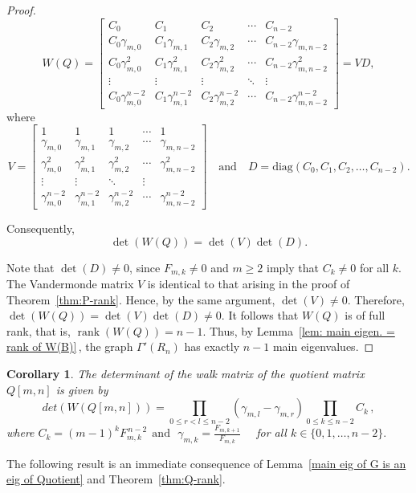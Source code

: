\documentclass[11pt,oneside]{article}
\theoremstyle{plain}
\theoremstyle{plain}
\newtheorem{corollary}[theorem]{Corollary}
\theoremstyle{definition}
\numberwithin{figure}{section}
\theoremstyle{remark}
\numberwithin{equation}{section}
\begin{document}
\begin{proof}
			\[\renewcommand{\arraystretch}{1.2}
			W(Q) =
			\begin{bmatrix}
				C_0 & C_1 & C_2 & \cdots & C_{n-2} \\
				C_0\gamma_{m,0} & C_1 \gamma_{m,1} & C_2 \gamma_{m,2} & \cdots & C_{n-2} \gamma_{m,n-2} \\
				C_0\gamma_{m,0}^2 & C_1 \gamma_{m,1}^2 & C_2 \gamma_{m,2}^2 & \cdots & C_{n-2} \gamma_{m,n-2}^2 \\
				\vdots & \vdots  & \vdots & \ddots & \vdots \\
				C_0\gamma_{m,0}^{n-2} & C_1 \gamma_{m,1}^{n-2} & C_2 \gamma_{m,2}^{n-2} & \cdots & C_{n-2} \gamma_{m,n-2}^{n-2}
			\end{bmatrix}
			= V D,
			\]
			where 
			$$   V =
			\begin{bmatrix}
				1 & 1 & 1 & \cdots & 1 \\
				\gamma_{m,0} & \gamma_{m,1}& \gamma_{m,2} & \cdots & \gamma_{m,n-2} \\
				\gamma_{m,0}^2 & \gamma_{m,1}^2 & \gamma_{m,2}^2 & \cdots & \gamma_{m,n-2}^2 \\
				\vdots & \vdots & \ddots & \vdots \\
				\gamma_{m,0}^{n-2} & \gamma_{m,1}^{n-2} &\gamma_{m,2}^{n-2} & \cdots & \gamma_{m,n-2}^{n-2}
			\end{bmatrix} \quad \text{and} \quad D =\text{diag}(C_0,C_1,C_2, \dots,C_{n-2}).$$ 
			
			Consequently,
			\[
			\det(W(Q)) = \det(V)\det(D).
			\]
			
			Note that $\det(D) \neq 0$, since $F_{m,k} \neq 0$ and $m \ge 2$ imply that $C_k \neq 0$ for all $k$. The Vandermonde matrix $V$ is identical to that arising in the proof of Theorem~\ref{thm:P-rank}. Hence, by the same argument, $\det(V) \neq 0$. Therefore, $\det(W(Q))= \det(V)\det(D) \neq 0. $ It follows that $W(Q)$ is of full rank, that is, $\operatorname{rank}(W(Q)) = n-1$. Thus, by Lemma~\ref{lem: main eigen. = rank of W(B)}\,, the graph $\Gamma'(R_n)$ has exactly $n-1$ main eigenvalues.
		\end{proof}
		
		\begin{corollary}
			The determinant of the walk matrix of the quotient matrix $Q[m,n]$ is given by
			\[
			det(W(Q[m,n])) = \prod_{0\leq r < l \leq n-2} (\gamma_{m,l} - \gamma_{m,r})\prod_{0 \leq k \leq n-2} C_k\,,
			\]
			where
			$
			C_k = (m-1)^k F_{m,k}^{\,n-2} ~~\text{and}~~~\gamma_{m,k} = \frac{F_{m,k+1}}{F_{m,k}}$ ~~for all
			$ k\in \{0, 1, \dots, n-2\}. $ 
		\end{corollary}
		\newpage
		The following result is an immediate consequence of  Lemma~\ref{main eig of G is an eig of Quotient} and Theorem~\ref{thm:Q-rank}. 
		
\end{document}
